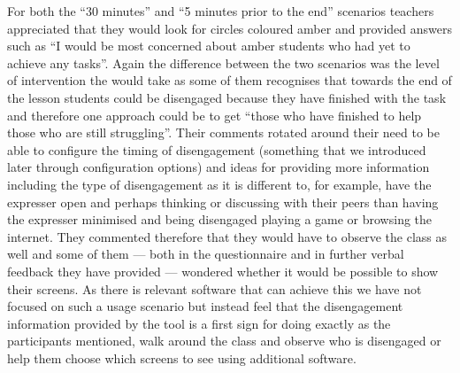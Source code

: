 For both the “30 minutes” and “5 minutes prior to the end” scenarios
teachers appreciated that they would look for circles coloured amber
and provided answers such as “I would be most concerned about amber
students who had yet to achieve any tasks”. Again the difference
between the two scenarios was the level of intervention the would take
as some of them recognises that towards the end of the lesson students
could be disengaged because they have finished with the task and
therefore one approach could be to get “those who have finished to
help those who are still struggling”. Their comments rotated around
their need to be able to configure the timing of disengagement
(something that we introduced later through configuration options) and
ideas for providing more information including the type of
disengagement as it is different to, for example, have the expresser
open and perhaps thinking or discussing with their peers than having
the expresser minimised and being disengaged playing a game or
browsing the internet. They commented therefore that they would have
to observe the class as well and some of them --- both in the
questionnaire and in further verbal feedback they have provided ---
wondered whether it would be possible to show their screens. As there
is relevant software that can achieve this we have not focused on such
a usage scenario but instead feel that the disengagement information
provided by the tool is a first sign for doing exactly as the
participants mentioned, walk around the class and observe who is
disengaged or help them choose which screens to see using additional
software. 

